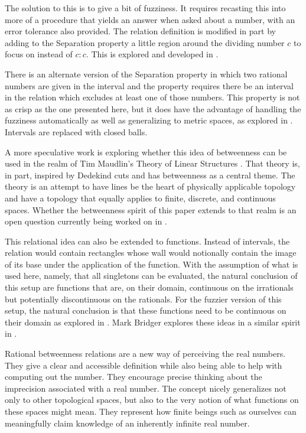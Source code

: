 \documentclass[12pt]{article}
\begin{document}
The solution to this is to give a bit of fuzziness. It requires recasting this into more of a procedure that yields an answer when asked about a number, with an error tolerance also provided. The relation definition is modified in part by adding to the Separation property a little region around the dividing number $c$ to focus on instead of $c:c$. This is explored and developed in \cite{taylor23main}.

There is an alternate version of the Separation property in which two rational numbers are given in the interval and the property requires there be an interval in the relation which excludes at least one of those numbers. This property is not as crisp as the one presented here, but it does have the advantage of handling the fuzziness automatically as well as generalizing to metric spaces, as explored in \cite{taylor23metric}. Intervals are replaced with closed balls. 

A more speculative work is exploring whether this idea of betweenness can be used in the realm of Tim Maudlin's Theory of Linear Structures \cite{maudlin}. That theory is, in part, inspired by Dedekind cuts and has betweenness as a central theme. The theory is an attempt to have lines be the heart of physically applicable topology and have a topology that equally applies to finite, discrete, and continuous spaces. Whether the betweenness spirit of this paper extends to that realm is an open question currently being worked on in \cite{taylor23maudlin}.

This relational idea can also be extended to functions. Instead of intervals, the relation would contain rectangles whose wall would notionally contain the image of its base under the application of the function. With the assumption of what is used here, namely, that all singletons can be evaluated, the natural conclusion of this setup are functions that are, on their domain, continuous on the irrationals but potentially discontinuous on the rationals. For the fuzzier version of this setup, the natural conclusion is that these functions need to be continuous on their domain as explored in \cite{taylor23main}. Mark Bridger explores  these ideas in a similar spirit in \cite{bridger}.

Rational betweenness relations are a new way of perceiving the real numbers. They give a clear and accessible definition while also being able to help with computing out the number. They encourage precise thinking about the imprecision associated with a real number. The concept nicely generalizes not only to other topological spaces, but also to the very notion of what functions on these spaces might mean. They represent how finite beings such as ourselves can meaningfully claim knowledge of an inherently infinite real number. 


\medskip

\normalem %
\printbibliography
\end{document}
